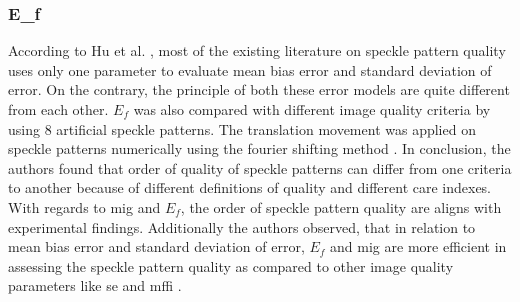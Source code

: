 
    \subsubsection{E\textbf{_f}}
        According to Hu et al. \cite{hu_ef}, most of the existing literature on speckle pattern quality uses only one parameter to evaluate mean bias error and standard deviation of error. On the contrary, the principle of both these error models are quite different from each other. $E_f$ was also compared with different image quality criteria by using 8 artificial speckle patterns. The translation movement was applied on speckle patterns numerically using the fourier shifting method \cite{schreier}. In conclusion, the authors found that order of quality of speckle patterns can differ from one criteria to another because of different definitions of quality and different care indexes. With regards to \gls{mig} and $E_f$, the order of speckle pattern quality are aligns with experimental findings. Additionally the authors observed, that in relation to mean bias error and standard deviation of error, $E_f$ and \gls{mig} are more efficient in assessing the speckle pattern quality as compared to other image quality parameters like \gls{se} and \gls{mffi} \cite{hu_ef}.

        
        
